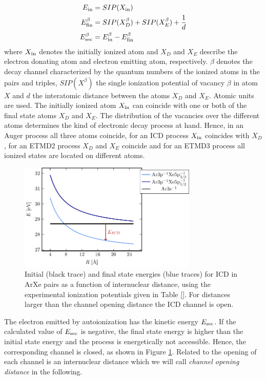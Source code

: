 \begin{align}
 E_{\rm in}        &= SIP(X_{\rm in}) \label{equation:E_in}\\
 E_{\rm fin}^\beta &= SIP(X_{D}^\beta) + SIP(X_{E}^\beta) + \frac 1d
           \label{equation:E_fin}\\
 E_{\rm sec}^\beta &= E_{\rm in}^\beta - E_{\rm fin}^\beta \label{equation:E_sec}
\end{align}
where $X_{\rm in}$ denotes the initially ionized atom and
$X_{D}$ and $X_{E}$ describe the electron donating atom and electron
emitting atom, respectively.
$\beta$ denotes the decay channel characterized by the quantum numbers of the ionized atoms in the pairs and triples, $SIP(X^\beta)$ the single ionization potential of vacancy $\beta$ in atom $X$ and $d$ the interatomic distance between the atoms $X_{D}$ and $X_{E}$. 
Atomic units are used.
The initially ionized atom $X_{\rm in}$ can
coincide with one or both of
the final state atoms
$X_{D}$ and $X_{E}$.
The distribution of the vacancies over the different
atoms determines the kind of electronic decay process at hand. Hence, in an
Auger process all three atoms coincide, for an ICD process $X_{\rm in}$
coincides with $X_{D}$, for an ETMD2 process $X_D$ and $X_E$ coincide
and for an {ETMD}3 process
all ionized states are located on different atoms.

\begin{figure}[h]
 \centering
 \includegraphics[width=8.5cm]{pics/channel_open_ICD.pdf}
 \caption{Initial (black trace) and final state energies (blue traces) 
          for ICD in ArXe pairs as a function of 
          internuclear distance, using the experimental ionization potentials given
          in Table \ref{}. For distances larger than the channel opening
          distance the ICD channel is open.}
 \label{figure:channel_open_ICD}
\end{figure}

The electron emitted by autoionization has the kinetic energy $E_{\rm sec}$. 
If the calculated value of $E_{\rm sec}$ is negative,
the final state energy is higher than the initial state energy and the        
process is energetically not accessible. Hence, the corresponding channel     
is closed, as shown in Figure \ref{figure:channel_open_ICD}. Related to
the opening of each channel is an internuclear distance which we will call 
\emph{channel opening distance} in the following.
                                                               

